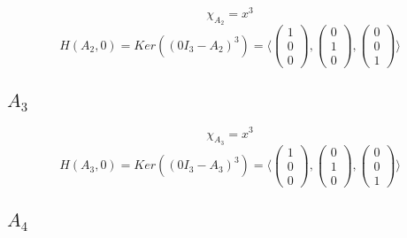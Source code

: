 \documentclass[10pt,a4paper]{article}
\begin{document}
\begin{equation}
\chi_{A_{2}} = x^{3}
\end{equation}
\begin{equation}
H(A_{2}, 0) = Ker \left( (0I_{3} - A_{2})^{3} \right) = \langle
\begin{pmatrix}
1\\0\\0
\end{pmatrix},
\begin{pmatrix}
0\\1\\0
\end{pmatrix},
\begin{pmatrix}
0\\0\\1
\end{pmatrix}
\rangle
\end{equation}

\subsection*{$A_{3}$}

\begin{equation}
\chi_{A_{3}} = x^{3}
\end{equation}
\begin{equation}
H(A_{3}, 0) = Ker \left( (0I_{3} - A_{3})^{3} \right) = \langle
\begin{pmatrix}
1\\0\\0
\end{pmatrix},
\begin{pmatrix}
0\\1\\0
\end{pmatrix},
\begin{pmatrix}
0\\0\\1
\end{pmatrix}
\rangle
\end{equation}

\subsection*{$A_{4}$}
\end{document}
